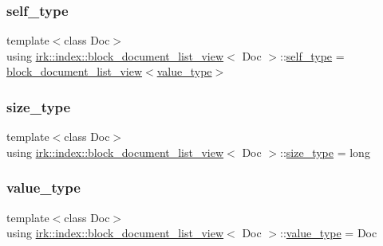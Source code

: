 \subsubsection{\texorpdfstring{self\+\_\+type}{self\_type}}
{\footnotesize\ttfamily template$<$class Doc$>$ \\
using \mbox{\hyperlink{classirk_1_1index_1_1block__document__list__view}{irk\+::index\+::block\+\_\+document\+\_\+list\+\_\+view}}$<$ Doc $>$\+::\mbox{\hyperlink{classirk_1_1index_1_1block__document__list__view_a006662b07e3f2cd8f0c9709584e4f7f3}{self\+\_\+type}} =  \mbox{\hyperlink{classirk_1_1index_1_1block__document__list__view}{block\+\_\+document\+\_\+list\+\_\+view}}$<$\mbox{\hyperlink{classirk_1_1index_1_1block__document__list__view_a0741459717c42674c1cfe069ee876344}{value\+\_\+type}}$>$}

\mbox{\label{classirk_1_1index_1_1block__document__list__view_a29bf3e73748a771ec7f5c1e542d8bdb1}} 
\subsubsection{\texorpdfstring{size\+\_\+type}{size\_type}}
{\footnotesize\ttfamily template$<$class Doc$>$ \\
using \mbox{\hyperlink{classirk_1_1index_1_1block__document__list__view}{irk\+::index\+::block\+\_\+document\+\_\+list\+\_\+view}}$<$ Doc $>$\+::\mbox{\hyperlink{classirk_1_1index_1_1block__document__list__view_a29bf3e73748a771ec7f5c1e542d8bdb1}{size\+\_\+type}} =  long}

\mbox{\label{classirk_1_1index_1_1block__document__list__view_a0741459717c42674c1cfe069ee876344}} 
\subsubsection{\texorpdfstring{value\+\_\+type}{value\_type}}
{\footnotesize\ttfamily template$<$class Doc$>$ \\
using \mbox{\hyperlink{classirk_1_1index_1_1block__document__list__view}{irk\+::index\+::block\+\_\+document\+\_\+list\+\_\+view}}$<$ Doc $>$\+::\mbox{\hyperlink{classirk_1_1index_1_1block__document__list__view_a0741459717c42674c1cfe069ee876344}{value\+\_\+type}} =  Doc}



